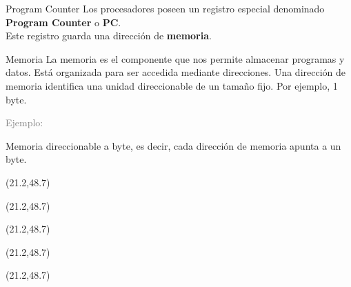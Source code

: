 \documentclass[aspectratio=169]{beamer}
\begin{document}
\begin{frame}[fragile,t]{Program Counter}
    Los procesadores poseen un registro especial denominado \textbf{Program Counter} o \textbf{PC}.\\
    \vspace{0.1cm}
    Este registro guarda una dirección de \textbf{memoria}.
    \pause
    \begin{block}{Memoria}
    \small
    La memoria es el componente que nos permite almacenar programas y datos.
    Está organizada para ser accedida mediante direcciones. Una dirección de memoria identifica una unidad direccionable de un tamaño fijo. Por ejemplo, 1 byte.
    \end{block}
    \textcolor{gray}{Ejemplo:}
    \begin{center}
    \vspace{1.1cm}
    \footnotesize Memoria direccionable a byte, es decir, cada dirección de memoria apunta a un byte.\\
    \end{center}
     
    \begin{textblock}{70}(21.2,48.7)  \end{textblock}
    \begin{textblock}{70}(21.2,48.7)  \end{textblock}
    \begin{textblock}{70}(21.2,48.7)  \end{textblock}
    \begin{textblock}{70}(21.2,48.7)  \end{textblock}
    \begin{textblock}{70}(21.2,48.7)  \end{textblock}
\end{frame}
\end{document}
